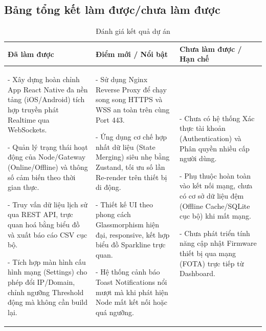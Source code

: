 \documentclass{article}
\begin{document}
\subsection{Bảng tổng kết làm được/chưa làm được}
\begin{table}[H]
    \centering
    \renewcommand{\arraystretch}{1.4}
    \begin{tabularx}{\textwidth}{|X|X|X|}
        \hline
        \textbf{Đã làm được} & \textbf{Điểm mới / Nổi bật} & \textbf{Chưa làm được / Hạn chế} \\
        \hline
        - Xây dựng hoàn chỉnh App React Native đa nền tảng (iOS/Android) tích hợp truyền phát Realtime qua WebSockets. \par
        - Quản lý trạng thái hoạt động của Node/Gateway (Online/Offline) và thông số cảm biến theo thời gian thực. \par
        - Truy vấn dữ liệu lịch sử qua REST API, trực quan hoá bằng biểu đồ và xuất báo cáo CSV cục bộ. \par
        - Tích hợp màn hình cấu hình mạng (Settings) cho phép đổi IP/Domain, chỉnh ngưỡng Threshold động mà không cần build lại.
        & 
        - Sử dụng Nginx Reverse Proxy để chạy song song HTTPS và WSS an toàn trên cùng Port 443. \par
        - Ứng dụng cơ chế hợp nhất dữ liệu (State Merging) siêu nhẹ bằng Zustand, tối ưu số lần Re-render trên thiết bị di động. \par
        - Thiết kế UI theo phong cách Glassmorphism hiện đại, responsive, kết hợp biểu đồ Sparkline trực quan. \par
        - Hệ thống cảnh báo Toast Notifications nổi mượt mà khi phát hiện Node mất kết nối hoặc quá ngưỡng.
        & 
        - Chưa có hệ thống Xác thực tài khoản (Authentication) và Phân quyền nhiều cấp người dùng. \par
        - Phụ thuộc hoàn toàn vào kết nối mạng, chưa có cơ sở dữ liệu đệm (Offline Cache/SQLite cục bộ) khi mất mạng. \par
        - Chưa phát triển tính năng cập nhật Firmware thiết bị qua mạng (FOTA) trực tiếp từ Dashboard. \\
        \hline
    \end{tabularx}
    \caption{Đánh giá kết quả dự án}
\end{table}
\end{document}
